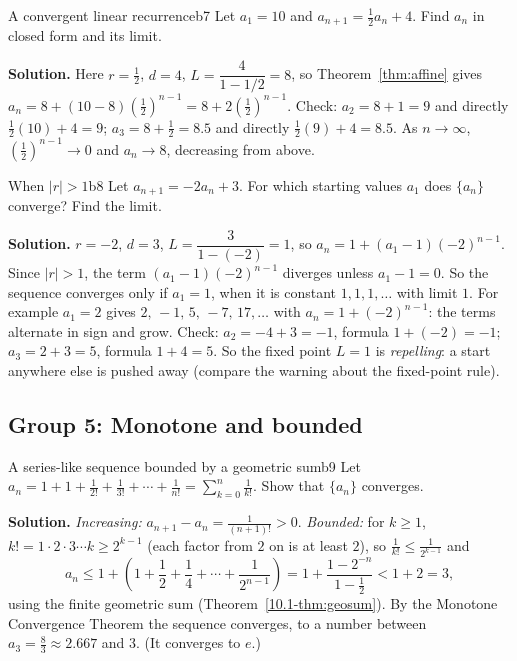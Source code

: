 \documentclass[11pt]{article}
\begin{document}
\begin{exmp}{A convergent linear recurrence}{b7}
Let $a_1=10$ and $a_{n+1}=\frac12a_n+4$. Find $a_n$ in closed form and its limit.

\textbf{Solution.} Here $r=\frac12$, $d=4$, $L=\dfrac4{1-1/2}=8$, so Theorem~\ref{thm:affine} gives $a_n=8+(10-8)\left(\frac12\right)^{n-1}=8+2\left(\frac12\right)^{n-1}$. Check: $a_2=8+1=9$ and directly $\frac12(10)+4=9$; $a_3=8+\frac12=8.5$ and directly $\frac12(9)+4=8.5$. As $n\to\infty$, $\left(\frac12\right)^{n-1}\to0$ and $a_n\to8$, decreasing from above.
\end{exmp}

\begin{exmp}{When $|r|>1$}{b8}
Let $a_{n+1}=-2a_n+3$. For which starting values $a_1$ does $\{a_n\}$ converge? Find the limit.

\textbf{Solution.} $r=-2$, $d=3$, $L=\dfrac3{1-(-2)}=1$, so $a_n=1+(a_1-1)(-2)^{n-1}$. Since $|r|>1$, the term $(a_1-1)(-2)^{n-1}$ diverges unless $a_1-1=0$. So the sequence converges only if $a_1=1$, when it is constant $1,1,1,\dots$ with limit $1$. For example $a_1=2$ gives $2,\,-1,\,5,\,-7,\,17,\dots$ with $a_n=1+(-2)^{n-1}$: the terms alternate in sign and grow. Check: $a_2=-4+3=-1$, formula $1+(-2)=-1$; $a_3=2+3=5$, formula $1+4=5$.
So the fixed point $L=1$ is \emph{repelling}: a start anywhere else is pushed away (compare the warning about the fixed-point rule).
\end{exmp}

\subsection*{Group 5: Monotone and bounded}

\begin{exmp}{A series-like sequence bounded by a geometric sum}{b9}
Let $a_n=1+1+\frac1{2!}+\frac1{3!}+\cdots+\frac1{n!}=\sum_{k=0}^n\frac1{k!}$. Show that $\{a_n\}$ converges.

\textbf{Solution.} \emph{Increasing:} $a_{n+1}-a_n=\frac1{(n+1)!}>0$. \emph{Bounded:} for $k\ge1$, $k!=1\cdot2\cdot3\cdots k\ge2^{k-1}$ (each factor from $2$ on is at least $2$), so $\frac1{k!}\le\frac1{2^{k-1}}$ and
\[
a_n\le1+\left(1+\frac12+\frac14+\cdots+\frac1{2^{n-1}}\right)=1+\frac{1-2^{-n}}{1-\frac12}<1+2=3 ,
\]
using the finite geometric sum (Theorem~\ref{10.1-thm:geosum}). By the Monotone Convergence Theorem the sequence converges, to a number between $a_3=\frac{8}{3}\approx2.667$ and $3$. (It converges to $e$.)
\end{exmp}
\end{document}
